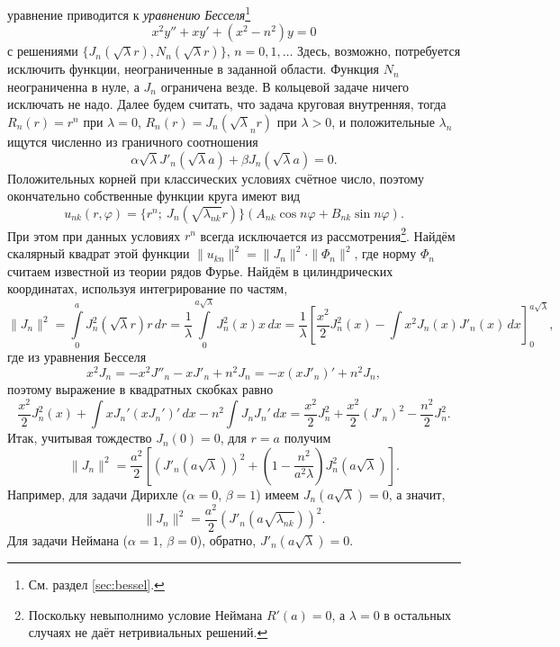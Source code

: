 уравнение
приводится к \emph{уравнению Бесселя}\footnote{См. раздел \ref{sec:bessel}.} 
\[
    x^2y'' + xy' + (x^2 - n^2) y = 0
\]
с решениями $ \{J_n(\sqrt \lambda r), N_n(\sqrt\lambda r)\} $, $ n = 0, 1, \ldots $
Здесь, возможно, потребуется исключить функции, неограниченные в
заданной области. Функция $ N_n $ неограниченна в нуле, а $ J_n $ ограничена
везде.
В кольцевой задаче ничего исключать не надо. Далее будем считать, что задача
круговая внутренняя, тогда $ R_n(r) = r^n $ при $ \lambda = 0 $, $ R_n(r) =
J_n(\sqrt\lambda_n r) $ при $ \lambda > 0 $, и положительные $
\lambda_n $ ищутся
численно из
граничного соотношения  
\[
    \alpha \sqrt\lambda J'_n(\sqrt\lambda a) + \beta J_n(\sqrt\lambda a) = 0.
\]
Положительных корней при классических условиях счётное число, поэтому окончательно собственные функции
круга имеют вид 
\[
u_{nk}(r, \varphi) = \{r^n; \ J_n(\sqrt{\lambda_{nk}} r)\}(A_{nk}\cos n\varphi +
  B_{nk}\sin
  n\varphi).
\]
При этом при данных условиях $ r^n $ всегда исключается из
рассмотрения\footnote{Поскольку невыполнимо условие Неймана $ R'(a) = 0 $, а $
\lambda = 0 $ в остальных случаях не даёт нетривиальных решений.}. Найдём скалярный квадрат этой функции $ \|u_{kn}\|^2 =
\|J_n\|^2\cdot\|\Phi_n\|^2 $, где норму $ \Phi_n $ считаем известной из
теории рядов Фурье. Найдём в цилиндрических координатах, используя
интегрирование по частям,
\[
    \|J_n\|^2 = \int\limits_{0}^{a} J^2_n(\sqrt\lambda r)r\,dr =
    \frac{1}{\lambda}\int\limits_{0}^{a\sqrt\lambda}J^2_n(x)x\,dx =
    \frac{1}{\lambda} \left[ \frac{x^2}{2}J^2_n(x) -
    \int x^2 J_n(x)J'_n(x)\,dx  \right]^{a\sqrt\lambda}_0,
\]
где из уравнения Бесселя
\[
  x^2 J_n = -x^2 J''_n - xJ'_n + n^2J_n = - x(xJ'_n)' + n^2 J_n,
\]
поэтому выражение в квадратных скобках равно
\[
  \frac{x^2}{2} J^2_n(x) + \int xJ_n' (xJ_n')'\,dx - n^2 \int J_n J_n' \, dx
  =
  \frac{x^2}{2} J^2_n + \frac{x^2}{2} (J'_n)^2 - \frac{n^2}{2} J^2_n.
\]
Итак, учитывая тождество $ J_n(0) = 0 $, для $ r = a $ получим
\[
    \|J_n\|^2 = \frac{a^2}{2} \left[ (J'_n(a\sqrt\lambda))^2 + \left( 1 -
    \frac{n^2}{a^2\lambda} \right) J_n^2 (a\sqrt\lambda) \right].
\]
Например, для задачи Дирихле ($ \alpha = 0 $, $ \beta = 1 $) имеем $
J_n(a\sqrt\lambda) = 0 $, а значит,  
\[
  \|J_n\|^2 = \frac{a^2}{2} (J'_n(a\sqrt{\lambda_{nk}}))^2.
\]
Для задачи Неймана ($ \alpha = 1 $, $ \beta = 0 $), обратно, $ J'_n(a\sqrt\lambda) = 0. $


